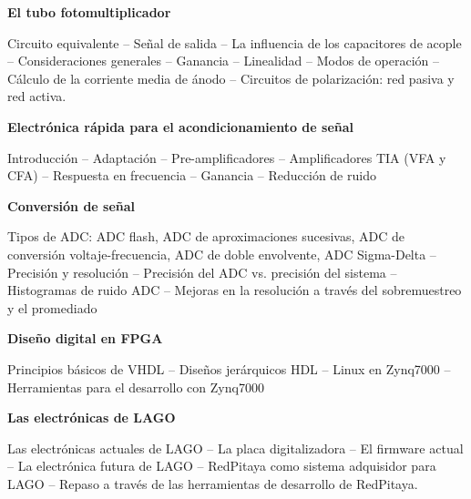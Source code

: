 \documentclass[11pt]{exam}
\begin{document}
%
%
%

\begin{questions}

\question \textbf{El tubo fotomultiplicador}

Circuito equivalente -- Señal de salida -- La influencia de los capacitores de acople 
-- Consideraciones generales -- Ganancia -- Linealidad -- Modos de operación -- 
Cálculo de la corriente media de ánodo -- Circuitos de polarización: red pasiva y 
red activa.

\question \textbf{Electrónica rápida para el acondicionamiento de señal} 

Introducción -- Adaptación -- Pre-amplificadores -- Amplificadores TIA (VFA y CFA) -- Respuesta en 
frecuencia -- Ganancia -- Reducción de ruido

\question \textbf{Conversión de señal}

Tipos de ADC: ADC flash, ADC de aproximaciones sucesivas, ADC de conversión voltaje-frecuencia, 
ADC de doble envolvente, ADC Sigma-Delta -- Precisión y resolución -- Precisión del 
ADC vs. precisión del sistema -- Histogramas de ruido ADC -- Mejoras en la 
resolución a través del sobremuestreo y el promediado

\question \textbf{Diseño digital en FPGA}

Principios básicos de VHDL -- Diseños jerárquicos HDL --
Linux en Zynq7000 -- Herramientas para el desarrollo con Zynq7000



\question \textbf{Las electrónicas de LAGO}

Las electrónicas actuales de LAGO -- La placa digitalizadora -- El firmware actual --
La electrónica futura de LAGO -- RedPitaya como sistema adquisidor para LAGO -- Repaso a 
través de las herramientas de desarrollo de RedPitaya.


\end{questions}
\end{document}
